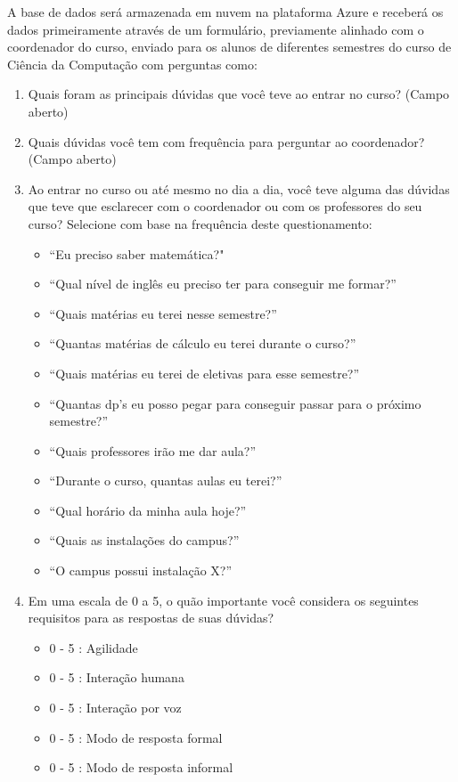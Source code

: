 \documentclass[
	12pt,				%
	oneside,
	a4paper,			%
	english,			%
	french,				%
	spanish,			%
	brazil				%
	]{abntex2}
\begin{document}
A base de dados será armazenada em nuvem na plataforma Azure e receberá os dados primeiramente através de um formulário, previamente alinhado com o coordenador do curso, enviado para os alunos de diferentes semestres do curso de Ciência da Computação com perguntas como:
\begin{enumerate}
\item Quais foram as principais dúvidas que você teve ao entrar no curso? (Campo aberto)
\item Quais dúvidas você tem com frequência para perguntar ao coordenador? (Campo aberto)

\item Ao entrar no curso ou até mesmo no dia a dia, você teve alguma das dúvidas que teve que esclarecer com o coordenador ou com os professores do seu curso? Selecione com base na frequência deste questionamento:
\begin{itemize}
\item “Eu preciso saber matemática?"
\item “Qual nível de inglês eu preciso ter para conseguir me formar?”
\item “Quais matérias eu terei nesse semestre?”
\item “Quantas matérias de cálculo eu terei durante o curso?”
\item “Quais matérias eu terei de eletivas para esse semestre?”
\item “Quantas dp’s eu posso pegar para conseguir passar para o próximo semestre?”
\item “Quais professores irão me dar aula?”
\item “Durante o curso, quantas aulas eu terei?”
\item “Qual horário da minha aula hoje?”
\item “Quais as instalações do campus?”
\item“O campus possui instalação X?”
\end{itemize}

\item Em uma escala de 0 a 5, o quão importante você considera os seguintes requisitos para as respostas de suas dúvidas?
\begin{itemize}
\item 0 - 5 : Agilidade
\item 0 - 5 : Interação humana
\item 0 - 5 : Interação por voz
\item 0 - 5 : Modo de resposta formal
\item 0 - 5 : Modo de resposta informal
\end{itemize}

\end{enumerate}
\end{document}
